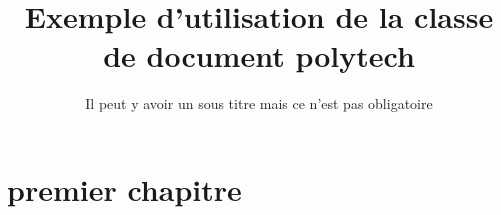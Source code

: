 \documentclass[noposter]{polytech/polytech}
\title{Exemple d'utilisation de la classe de document \mbox{polytech}}
\subtitle{Il peut y avoir un sous titre mais ce n'est pas obligatoire}
\begin{document}
 

 
\chapter{premier chapitre}

\cite{article}

\cite{key1}
\cite{key2}
\cite{online1}
\cite{online2}
\end{document}
